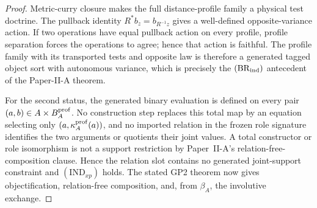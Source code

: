 \documentclass[11pt,a4paper]{article}
\begin{document}
\begin{proof}
Metric-curry closure makes the full distance-profile family a physical test
doctrine.  The pullback identity
\(R^*b_z=b_{R^{-1}z}\) gives a well-defined opposite-variance action.  If two
operations have equal pullback action on every profile, profile separation
forces the operations to agree; hence that action is faithful.  The profile
family with its transported tests and opposite law is therefore a generated
tagged object sort with autonomous variance, which is precisely the
\((\mathrm{BR}_{\rm ind})\) antecedent of the Paper-II-A theorem.

For the second status, the generated binary evaluation is defined on every
pair \((a,b)\in A\times B_A^{\rm prof}\).  No construction step replaces this
total map by an equation selecting only
\((a,\kappa_A^{\rm prof}(a))\), and no imported relation in
the frozen role signature identifies the two arguments or quotients their
joint values.  A total constructor or role isomorphism is not a support
restriction by Paper~II-A's relation-free-composition clause.  Hence the
relation slot contains no generated joint-support constraint and
\((\mathrm{IND}_{xp})\) holds.  The stated GP2 theorem now gives
objectification, relation-free composition, and, from \(\beta_A\), the
involutive exchange.
\end{proof}
\end{document}
